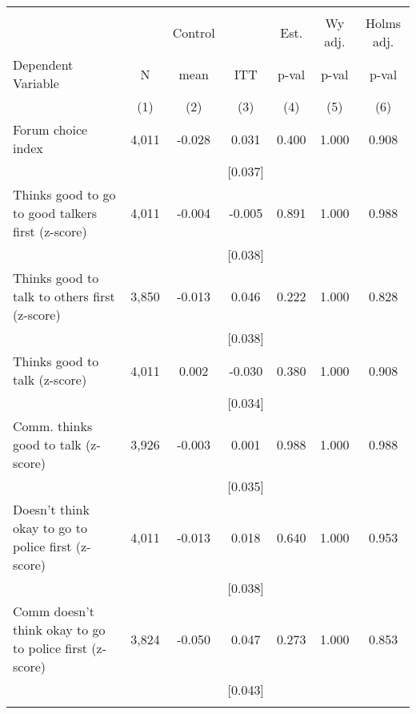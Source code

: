 \begin{tabular}{lcccccc}
\hline \noalign{\smallskip} &  &  &  &  &  & \\
 &  & Control &  & Est. & Wy adj. & Holms adj.\\
Dependent Variable & N & mean & ITT & p-val & p-val & p-val\\
 & (1) & (2) & (3) & (4) & (5) & (6)\\
\noalign{\smallskip}\hline \noalign{\smallskip}Forum choice index & 4,011 & -0.028 & 0.031 & 0.400 & 1.000 & 0.908\\
 &  &  & [0.037] &  &  & \\
\quad Thinks good to go to good talkers first (z-score) & 4,011 & -0.004 & -0.005 & 0.891 & 1.000 & 0.988\\
 &  &  & [0.038] &  &  & \\
\quad Thinks good to talk to others first (z-score) & 3,850 & -0.013 & 0.046 & 0.222 & 1.000 & 0.828\\
 &  &  & [0.038] &  &  & \\
\quad Thinks good to talk (z-score) & 4,011 & 0.002 & -0.030 & 0.380 & 1.000 & 0.908\\
 &  &  & [0.034] &  &  & \\
\quad Comm. thinks good to talk (z-score) & 3,926 & -0.003 & 0.001 & 0.988 & 1.000 & 0.988\\
 &  &  & [0.035] &  &  & \\
\quad Doesn't think okay to go to police first (z-score) & 4,011 & -0.013 & 0.018 & 0.640 & 1.000 & 0.953\\
 &  &  & [0.038] &  &  & \\
\quad Comm doesn't think okay to go to police first (z-score) & 3,824 & -0.050 & 0.047 & 0.273 & 1.000 & 0.853\\
 &  &  & [0.043] &  &  & \\
\noalign{\smallskip}\hline\end{tabular}
